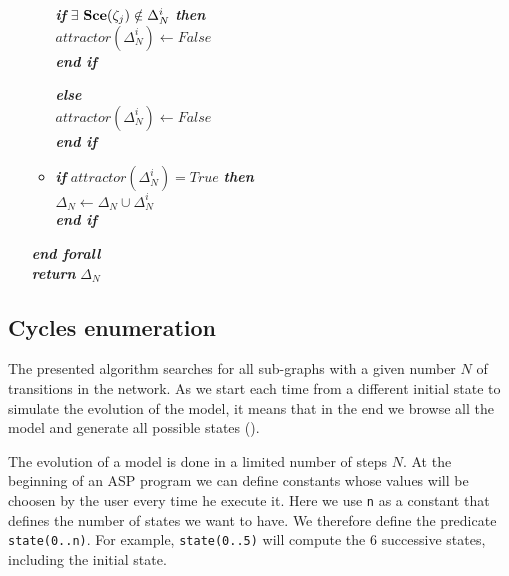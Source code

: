 \begin{algorithm}[!h]
\begin{itemize}
\begin{itemize}
							\hspace{1.2cm} \textbf{\textit{if}} $\exists$ $\mathbf{Sce}(\zeta_j) \notin  \Delta_N^i$ \textbf{\textit{then}} \\ \hspace{1.7cm} $attractor(\Delta_N^i) \longleftarrow False$ \\
							\hspace{1.2cm} \textbf{\textit{end if}} 
							
							\textbf{\textit{else}} \\
							\hspace{0.7cm} $attractor(\Delta_N^i) \longleftarrow False$ \\
							\textbf{\textit{end if}} 
					\item[] \textbf{\textit{if}} $attractor(\Delta_N^i) = True$ \textbf{\textit{then}}\\
					\hspace{0.5cm}  $\Delta_N \longleftarrow \Delta_N \cup \Delta_N^i$ \\
					\textbf{\textit{end if}} 

				\end{itemize}		
			\hspace{0.2cm} \textbf{\textit{end forall}} \\		
			\hspace{0.2cm} \textbf{\textit{return}} $\Delta_N$		
	\end{itemize}
\end{algorithm}

\subsection{Cycles enumeration}
The presented algorithm searches for all sub-graphs with a given number $N$ of transitions %
in the network. As we start each time from a different initial state to simulate the evolution of the model, it means that in the end we browse all the model and generate all possible states (). 

The evolution of a model is done in a limited number of steps $N$. At the beginning of an ASP program we can define constants whose values will be choosen by the user every time he execute it. Here we use \texttt{n} as a constant that defines the number of states we want to have.
We therefore define the predicate \texttt{state(0..n)}.
For example, \texttt{state(0..5)} will compute the 6 successive states, including the initial state.

